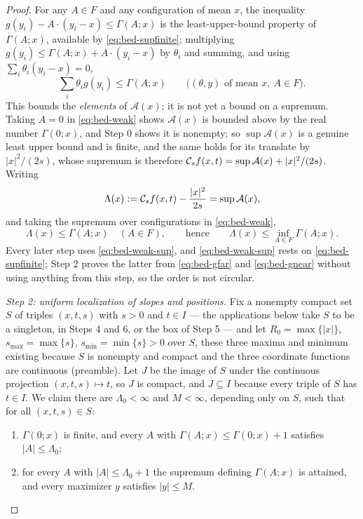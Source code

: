 \begin{proof}
For any $A\in F$ and any configuration of mean $x$, the inequality
$g(y_i)-A\cdot(y_i-x)\le\Gamma(A;x)$ is the least-upper-bound property of
$\Gamma(A;x)$, available by \eqref{eq:bed-supfinite}; multiplying
$g(y_i)\le\Gamma(A;x)+A\cdot(y_i-x)$ by $\theta_i$ and summing, and using
$\sum_i\theta_i(y_i-x)=0$,
\begin{equation}\label{eq:bed-weak}
  \sum_i\theta_ig(y_i)\le\Gamma(A;x)
  \qquad\bigl((\theta,y)\text{ of mean }x,\ A\in F\bigr).
\end{equation}
This bounds the \emph{elements} of $\mathcal A(x)$; it is not yet a bound on a
supremum. Taking $A=0$ in \eqref{eq:bed-weak} shows $\mathcal A(x)$ is bounded
above by the real number $\Gamma(0;x)$, and Step 0 shows it is nonempty; so
$\sup\mathcal A(x)$ is a genuine least upper bound and is
finite, and the same holds for its translate by $|x|^2/(2s)$, whose supremum is
therefore $\mathcal{C}_sf(x,t)=\sup\mathcal A(x)+|x|^2/(2s)$. Writing
\[
  \Lambda(x):=\mathcal{C}_sf(x,t)-\frac{|x|^2}{2s}=\sup\mathcal A(x),
\]
and taking the supremum over configurations in \eqref{eq:bed-weak},
\begin{equation}\label{eq:bed-weak-sup}
  \Lambda(x)\le\Gamma(A;x)\quad(A\in F),
  \qquad\text{hence}\qquad
  \Lambda(x)\le\inf_{A\in F}\Gamma(A;x).
\end{equation}
Every later step uses \eqref{eq:bed-weak-sup}, and \eqref{eq:bed-weak-sup}
rests on \eqref{eq:bed-supfinite}; Step 2 proves the latter from
\eqref{eq:bed-gfar} and \eqref{eq:bed-gnear} without using anything from this
step, so the order is not circular.

\emph{Step 2: uniform localization of slopes and positions.}
Fix a nonempty compact set $S$ of triples $(x,t,s)$ with $s>0$ and $t\in I$ —
the applications below take $S$ to be a singleton, in Steps 4 and 6, or the box
of Step 5 — and let $R_0=\max\{|x|\}$, $s_{\max}=\max\{s\}$,
$s_{\min}=\min\{s\}>0$ over $S$, these three maxima and minimum existing because
$S$ is nonempty and compact and the three coordinate functions are continuous
(preamble). Let $J$ be the image of $S$ under the continuous projection
$(x,t,s)\mapsto t$, so $J$ is compact, and $J\subseteq I$ because every triple of
$S$ has $t\in I$. We
claim there are $\Lambda_0<\infty$ and $M<\infty$, depending only on $S$, such
that for all $(x,t,s)\in S$:
\begin{enumerate}
\item[(a)] $\Gamma(0;x)$ is finite, and every $A$ with
$\Gamma(A;x)\le\Gamma(0;x)+1$ satisfies $|A|\le\Lambda_0$;
\item[(b)] for every $A$ with $|A|\le\Lambda_0+1$ the supremum defining
$\Gamma(A;x)$ is attained, and every maximizer $y$ satisfies $|y|\le M$.
\end{enumerate}


\end{proof}
